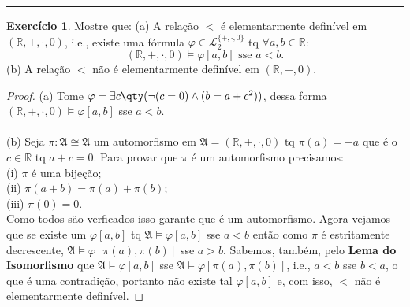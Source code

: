 \documentclass[11pt]{article}
\theoremstyle{definition}
\newtheorem{exer}{Exercício}
\newcommand{\mc}[1]{\mathcal{#1}}
\newcommand{\mf}[1]{\mathfrak{#1}}
\newcommand{\mbb}[1]{\mathbb{#1}}
\begin{document}
\hrule

\begin{exer}
Mostre que: (a) A relação $<$ é elementarmente definível em $(\mbb{R},+,\cdot,0)$, i.e., existe uma fórmula $\varphi\in\mc{L}^{\{+,\cdot,0\}}_2$ tq $\forall a,b\in\mbb{R}$:
\[
(\mbb{R},+,\cdot,0)\vDash\varphi[a,b]\text{ sse }a<b.
\]
(b) A relação $<$ não é elementarmente definível em $(\mbb{R},+,0)$.

\begin{proof}
(a) Tome $\varphi=\exists c\qty(\neg(c=0)\wedge(b=a+c^2))$, dessa forma $(\mbb{R},+,\cdot,0)\vDash\varphi[a,b]$ sse $a<b$.\\\\
(b) Seja $\pi:\mf{A}\cong\mf{A}$ um automorfismo em $\mf{A}=(\mbb{R},+,\cdot,0)$ tq $\pi(a) = -a$ que é o $c\in\mbb{R}$ tq $a+c=0$. Para provar que $\pi$ é um automorfismo precisamos:\\
(i) $\pi$ é uma bijeção;\\
(ii) $\pi(a+b)=\pi(a)+\pi(b)$;\\
(iii) $\pi(0)=0$.\\
Como todos são verficados isso garante que é um automorfismo. Agora vejamos que se existe um $\varphi[a,b]$ tq $\mf{A}\vDash\varphi[a,b]$ sse $a<b$ então como $\pi$ é estritamente decrescente, $\mf{A}\vDash\varphi[\pi(a),\pi(b)]$ sse $a>b$. Sabemos, também, pelo \textbf{Lema do Isomorfismo} que $\mf{A}\vDash\varphi[a,b]$ sse $\mf{A}\vDash\varphi[\pi(a),\pi(b)]$, i.e., $a<b$ sse $b<a$, o que é uma contradição, portanto não existe tal $\varphi[a,b]$ e, com isso, $<$ não é elementarmente definível.
\end{proof}
\end{exer}
\end{document}
